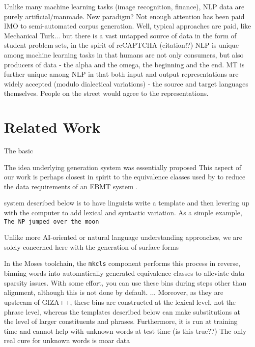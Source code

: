 Unlike many machine learning tasks (image recognition, finance), NLP data are purely artificial/manmade.  New paradigm?  Not enough attention has been paid IMO to semi-automated corpus generation.  Well, typical approaches are paid, like Mechanical Turk... but there is a vast untapped source of data in the form of student problem sets, in the spirit of reCAPTCHA (citation!?)
NLP is unique among machine learning tasks in that humans are not only consumers, but also producers of data - the alpha and the omega, the beginning and the end.
MT is further unique among NLP in that both input and output representations are widely accepted (modulo dialectical variations) - the source and target languages themselves.
People on the street would agree to the representations.



\section{Related Work}
\label{sec:related}

The basic 

The idea underlying generation system was essentially proposed 
This aspect of our work is perhaps closest in spirit to the equivalence classes used by  to reduce the data requirements of an EBMT system .

system described below is to have linguists write a template and then levering up with the computer to add lexical and syntactic variation.  
As a simple example, 
{\small \tt The NP jumped over the moon}





Unlike more AI-oriented or natural language understanding approaches, we are solely concerned here with the generation of surface forms





In the Moses toolchain, the {\small \tt mkcls} component  performs this process in reverse, binning words into automatically-generated equivalence classes to alleviate data sparsity issues.
With some effort, you can use these bins during steps other than alignment, although this is not done by default.
...
Moreover, as they are upstream of GIZA++, these bins are constructed at the lexical level, not the phrase level, whereas the templates described below can make substitutions at the level of larger constituents and phrases.
Furthermore, it is run at training time and cannot help with unknown words at test time (is this true??)
The only real cure for unknown words is moar data










